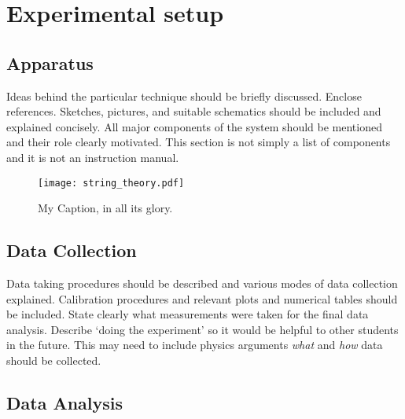 \documentclass[12pt,letterpaper,onecolumn]{article}
\begin{document}

\section{Experimental setup}


\subsection{Apparatus}

Ideas behind the particular technique should be briefly
discussed. Enclose references. Sketches, pictures, and
suitable schematics should be included and explained
concisely. All major components of the system should be
mentioned and their role clearly motivated. This section
is not simply a list of components and it is not an
instruction manual. 



\begin{figure}[h]
 \begin{center}
 \texttt{[image: string\_theory.pdf]}
 \caption{ My Caption, in all its glory.\label{fig:apparatus} }
 \end{center}
\end{figure}

\subsection{Data Collection}

Data taking procedures should be described and various modes of
data collection explained. Calibration procedures and
relevant plots and numerical tables should be included.
State clearly what measurements were taken for the final
data analysis. Describe `doing the experiment' so it would
be helpful to other students in the future. This may need
to include physics arguments {\em what } and {\em how } data should
be collected.


\subsection{Data Analysis}
\end{document}
